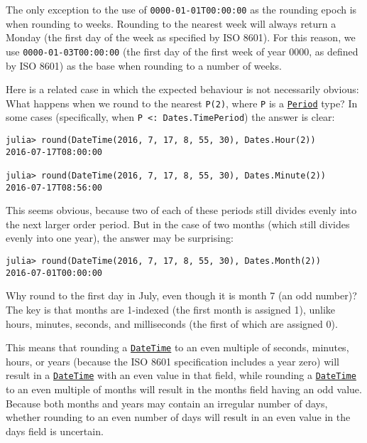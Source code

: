 The only exception to the use of \texttt{0000-01-01T00:00:00} as the rounding epoch is when rounding to weeks. Rounding to the nearest week will always return a Monday (the first day of the week as specified by ISO 8601). For this reason, we use \texttt{0000-01-03T00:00:00} (the first day of the first week of year 0000, as defined by ISO 8601) as the base when rounding to a number of weeks.



Here is a related case in which the expected behaviour is not necessarily obvious: What happens when we round to the nearest \texttt{P(2)}, where \texttt{P} is a \hyperlink{17624028548543163266}{\texttt{Period}} type? In some cases (specifically, when \texttt{P <: Dates.TimePeriod}) the answer is clear:




\begin{verbatim}
julia> round(DateTime(2016, 7, 17, 8, 55, 30), Dates.Hour(2))
2016-07-17T08:00:00

julia> round(DateTime(2016, 7, 17, 8, 55, 30), Dates.Minute(2))
2016-07-17T08:56:00
\end{verbatim}



This seems obvious, because two of each of these periods still divides evenly into the next larger order period. But in the case of two months (which still divides evenly into one year), the answer may be surprising:




\begin{verbatim}
julia> round(DateTime(2016, 7, 17, 8, 55, 30), Dates.Month(2))
2016-07-01T00:00:00
\end{verbatim}



Why round to the first day in July, even though it is month 7 (an odd number)? The key is that months are 1-indexed (the first month is assigned 1), unlike hours, minutes, seconds, and milliseconds (the first of which are assigned 0).



This means that rounding a \hyperlink{17572689933274889838}{\texttt{DateTime}} to an even multiple of seconds, minutes, hours, or years (because the ISO 8601 specification includes a year zero) will result in a \hyperlink{17572689933274889838}{\texttt{DateTime}} with an even value in that field, while rounding a \hyperlink{17572689933274889838}{\texttt{DateTime}} to an even multiple of months will result in the months field having an odd value. Because both months and years may contain an irregular number of days, whether rounding to an even number of days will result in an even value in the days field is uncertain.



